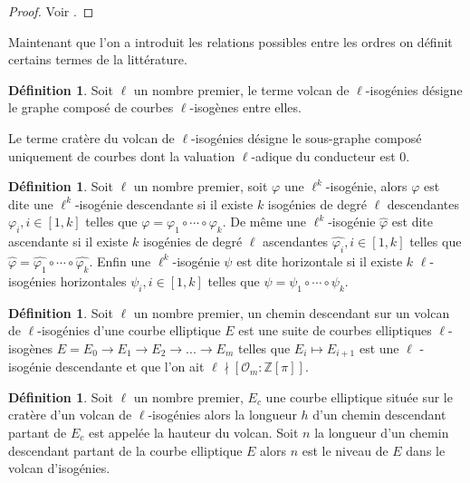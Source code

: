 \documentclass[10pt,a4paper]{book}
\theoremstyle{plain}
\theoremstyle{definition}
\theoremstyle{definition}
\theoremstyle{definition}
\theoremstyle{definition}
\newtheorem{defi}[thm]{Définition}
\theoremstyle{remark}
\theoremstyle{remark}
\theoremstyle{definition}
\begin{document}
\begin{proof}
Voir \cite[§2.3]{FouquetMorain02}.
\end{proof}

Maintenant que l'on a introduit les relations possibles entre les ordres on définit certains termes de la littérature.

\begin{defi}
Soit $\ell$ un nombre premier, le terme volcan de $\ell$-isogénies désigne le graphe composé de courbes $\ell$-isogènes entre elles.

Le terme cratère du volcan de $\ell$-isogénies désigne le sous-graphe composé uniquement de courbes dont la valuation $\ell$-adique du conducteur est $0$.
\end{defi}

\begin{defi}
Soit $\ell$ un nombre premier, soit $\varphi$ une $\ell^k$-isogénie, alors
$\varphi$ est dite une $\ell^k$-isogénie descendante si il existe $k$ 
isogénies de degré $\ell$ descendantes $\varphi_i, i \in [1,k]$ telles que 
$\varphi=\varphi_1 \circ \cdots \circ \varphi_k$. De même une 
$\ell^k$-isogénie $\widehat{\varphi}$ est dite ascendante si il existe $k$ 
isogénies de degré $\ell$ ascendantes $\widehat{\varphi_i}, i \in [1,k]$ 
telles que $\widehat{\varphi}=\widehat{\varphi_1} \circ \cdots \circ 
\widehat{\varphi_k}$. Enfin une $\ell^k$-isogénie $\psi$ est dite horizontale 
si il existe $k$ $\ell$-isogénies horizontales $\psi_i, i \in [1,k]$ telles 
que $\psi=\psi_1 \circ \cdots \circ \psi_k$.
\end{defi}

\begin{defi}
Soit $\ell$ un nombre premier, un chemin descendant sur un volcan de $\ell$-isogénies d'une courbe elliptique $E$ est une suite de courbes elliptiques $\ell$-isogènes $E=E_0 \rightarrow E_1 \rightarrow E_2 \rightarrow ... \rightarrow E_m$ telles que $E_i \mapsto E_{i+1}$ est une $\ell$ -isogénie descendante et que l'on ait $\ell \nmid [ \mathcal{O}_m : \mathbb{Z}[\pi]]$. 
\end{defi}

\begin{defi}
\label{def:haut:vol}
Soit $\ell$ un nombre premier, $E_c$ une courbe elliptique située sur le cratère d'un volcan de $\ell$-isogénies alors la longueur $h$ d'un chemin descendant partant de $E_c$ est appelée la hauteur du volcan.
Soit $n$ la longueur d'un chemin descendant partant de la courbe elliptique $E$ alors $n$ est le niveau de $E$ dans le volcan d'isogénies.
\end{defi}
\end{document}
